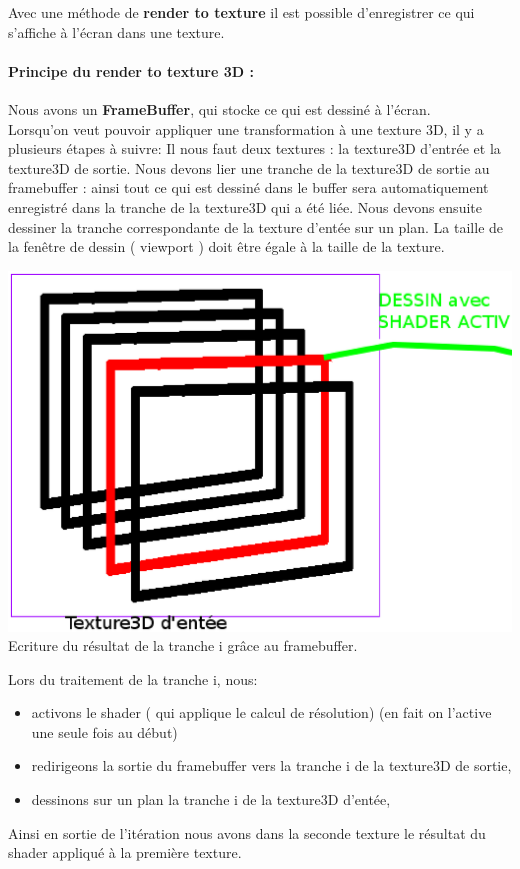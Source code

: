\documentclass[a4paper,10pt]{article}
\begin{document}
Avec une méthode de \textbf{render to texture} il est possible
d'enregistrer ce qui s'affiche à l'écran dans une texture.\\

\paragraph*{Principe du render to texture 3D :}

Nous avons un \textbf{FrameBuffer}, qui stocke ce qui est dessiné à l'écran.\\

Lorsqu'on veut pouvoir appliquer une transformation à une texture 3D, il y a plusieurs étapes à suivre:
Il nous faut deux textures : la texture3D d'entrée et la texture3D de sortie. Nous
devons lier une tranche de la texture3D de sortie au framebuffer : ainsi tout ce qui est dessiné dans le buffer
sera automatiquement enregistré dans la tranche de la texture3D qui a été liée.
Nous devons ensuite dessiner la tranche correspondante de la texture d'entée sur un plan. La taille de la fenêtre de dessin ( viewport ) doit être égale à la taille de la texture.

    \begin{center}
	\includegraphics[scale=0.5]{Framebuffer.ps}\\
	Ecriture du résultat de la tranche i grâce au framebuffer.
    \end{center}
    
Lors du traitement de la tranche i, nous:\\
\begin{itemize}
\item activons le shader ( qui applique le calcul de résolution) (en
  fait on l'active une seule fois au début)\\
\item redirigeons la sortie du framebuffer vers la tranche i de la texture3D de sortie,\\
\item dessinons sur un plan la tranche i de la texture3D d'entée,\\
\end{itemize}
Ainsi en sortie de l'itération nous avons dans la seconde texture le
résultat du shader appliqué à la première texture.\\
 
\end{document}
